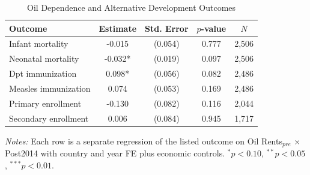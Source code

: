 \begin{table}[H]
\centering
\caption{Oil Dependence and Alternative Development Outcomes}
\label{tab:alt_outcomes}
\begin{threeparttable}
\begin{tabular}{lcccc}
\toprule
Outcome & Estimate & Std. Error & $p$-value & $N$ \\
\midrule
Infant mortality & -0.015 & (0.054) & 0.777 & 2,506 \\
Neonatal mortality & -0.032* & (0.019) & 0.097 & 2,506 \\
Dpt immunization & 0.098* & (0.056) & 0.082 & 2,486 \\
Measles immunization & 0.074 & (0.053) & 0.169 & 2,486 \\
Primary enrollment & -0.130 & (0.082) & 0.116 & 2,044 \\
Secondary enrollment & 0.006 & (0.084) & 0.945 & 1,717 \\
\bottomrule
\end{tabular}
\begin{tablenotes}\small
\item \textit{Notes:} Each row is a separate regression of the listed outcome on Oil Rents$_{pre}$ $\times$ Post2014 with country and year FE plus economic controls. $^{*}p<0.10$, $^{**}p<0.05$, $^{***}p<0.01$.
\end{tablenotes}
\end{threeparttable}
\end{table}
